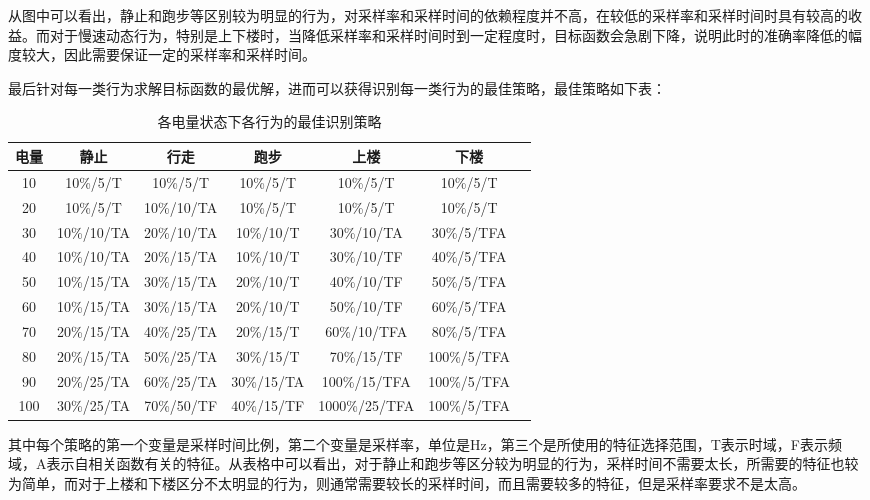 \par 从图中可以看出，静止和跑步等区别较为明显的行为，对采样率和采样时间的依赖程度并不高，在较低的采样率和采样时间时具有较高的收益。而对于慢速动态行为，特别是上下楼时，当降低采样率和采样时间时到一定程度时，目标函数会急剧下降，说明此时的准确率降低的幅度较大，因此需要保证一定的采样率和采样时间。
\par 最后针对每一类行为求解目标函数的最优解，进而可以获得识别每一类行为的最佳策略，最佳策略如下表：
\begin{table}[htb]
    \centering
    \caption{各电量状态下各行为的最佳识别策略}
    \begin{tabular}{ccccccc}
    \toprule
    电量 & 静止 & 行走 & 跑步 & 上楼 & 下楼 \\
    \midrule
    10 & 10\%/5/T & 10\%/5/T & 10\%/5/T & 10\%/5/T & 10\%/5/T \\
    20 & 10\%/5/T & 10\%/10/TA & 10\%/5/T & 10\%/5/T & 10\%/5/T \\
    30 & 10\%/10/TA & 20\%/10/TA & 10\%/10/T & 30\%/10/TA & 30\%/5/TFA \\
    40 & 10\%/10/TA & 20\%/15/TA & 10\%/10/T & 30\%/10/TF & 40\%/5/TFA \\
    50 & 10\%/15/TA & 30\%/15/TA & 20\%/10/T & 40\%/10/TF & 50\%/5/TFA \\
    60 & 10\%/15/TA & 30\%/15/TA & 20\%/10/T & 50\%/10/TF & 60\%/5/TFA \\
    70 & 20\%/15/TA & 40\%/25/TA & 20\%/15/T & 60\%/10/TFA & 80\%/5/TFA \\
    80 & 20\%/15/TA & 50\%/25/TA & 30\%/15/T & 70\%/15/TF & 100\%/5/TFA \\
    90 & 20\%/25/TA & 60\%/25/TA & 30\%/15/TA & 100\%/15/TFA & 100\%/5/TFA \\
    100 & 30\%/25/TA & 70\%/50/TF & 40\%/15/TF & 1000\%/25/TFA & 100\%/5/TFA \\
    \bottomrule
    \end{tabular}
\end{table}

\par 其中每个策略的第一个变量是采样时间比例，第二个变量是采样率，单位是Hz，第三个是所使用的特征选择范围，T表示时域，F表示频域，A表示自相关函数有关的特征。从表格中可以看出，对于静止和跑步等区分较为明显的行为，采样时间不需要太长，所需要的特征也较为简单，而对于上楼和下楼区分不太明显的行为，则通常需要较长的采样时间，而且需要较多的特征，但是采样率要求不是太高。
